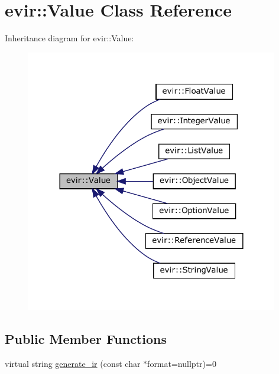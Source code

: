 \hypertarget{classevir_1_1Value}{}\section{evir\+:\+:Value Class Reference}
\label{classevir_1_1Value}


Inheritance diagram for evir\+:\+:Value\+:
\nopagebreak
\begin{figure}[H]
\begin{center}
\leavevmode
\includegraphics[width=312pt]{classevir_1_1Value__inherit__graph}
\end{center}
\end{figure}
\subsection*{Public Member Functions}
\begin{DoxyCompactItemize}
\item 
virtual string \hyperlink{classevir_1_1Value_a3e7e5bc634fd5bba528324076fe2a763}{generate\+\_\+ir} (const char $\ast$format=nullptr)=0
\end{DoxyCompactItemize}
